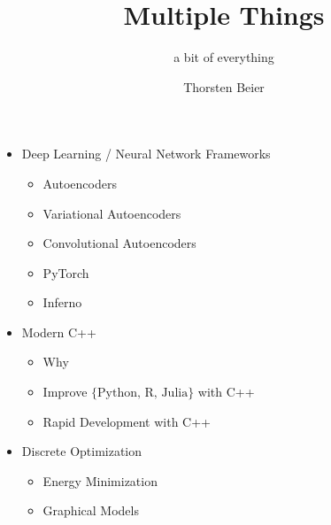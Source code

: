 \documentclass{beamer}
\title{Multiple Things}
\subtitle{a bit of everything}
\author{Thorsten Beier}
\begin{document}
\begin{frame}[label=current]
\titlepage
\end{frame}

\begin{frame}
  \begin{itemize}
        \item<+->Deep Learning / Neural Network Frameworks
        \begin{itemize}
            \item<+-> Autoencoders
            \item<+-> Variational Autoencoders
            \item<+-> Convolutional Autoencoders
            \item<+-> PyTorch
            \item<+-> Inferno
        \end{itemize}
        \item<+->Modern C++
        \begin{itemize}
            \item<+-> Why
            \item<+-> Improve $\{\text{Python, R, Julia}\}$ with C++
            \item<+-> Rapid Development with C++
        \end{itemize}     
        \item<+-> Discrete Optimization
        \begin{itemize}
            \item<+-> Energy Minimization
            \item<+-> Graphical Models
        \end{itemize}        
  \end{itemize}
\end{frame}




\newcommand{\source}[1]{\begin{textblock*}{12cm}(0.0cm, 8.0cm)
    \begin{beamercolorbox}[ht=0.5cm,right]{framesource}
        \usebeamerfont{framesource}\usebeamercolor[fg]{framesource} Source: {#1}
    \end{beamercolorbox}
\end{textblock*}}


\newcommand{\imgsource}[1]{\begin{textblock*}{12cm}(0.0cm, 8.0cm)
    \begin{beamercolorbox}[ht=0.5cm,right]{framesource}
        \usebeamerfont{framesource}\usebeamercolor[fg]{framesource} Image Source: {#1}
    \end{beamercolorbox}
\end{textblock*}}
\end{document}
